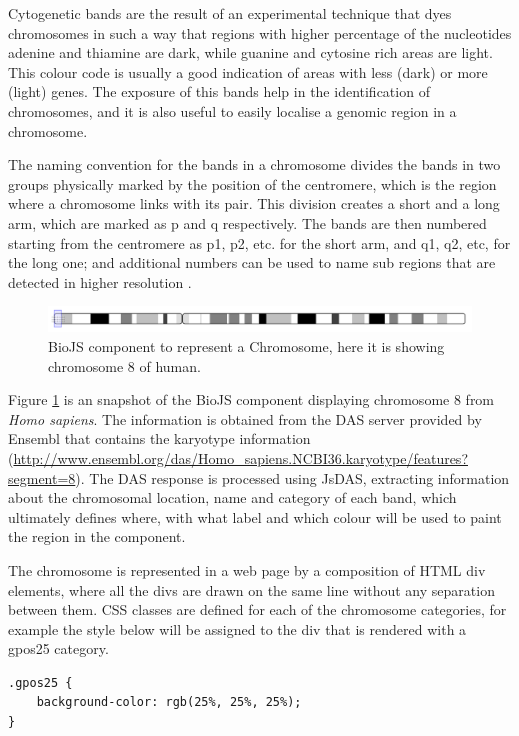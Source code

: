 Cytogenetic bands are the result of an experimental technique that dyes chromosomes in such a way that regions with higher percentage of the nucleotides adenine and thiamine are dark, while guanine and cytosine rich areas are light. This colour code is usually a good indication of areas with less (dark) or more (light) genes. The exposure of this bands help in the identification of chromosomes, and it is also useful to easily localise a genomic region in a chromosome.

The naming convention for the bands in a chromosome divides the bands in two groups physically marked by the position of the centromere, which is the region where a chromosome links with its pair. This division creates a short and a long arm, which are marked as p and q respectively. The bands are then numbered starting from the centromere as p1, p2, etc. for the short arm, and q1, q2, etc, for the long one; and additional numbers can be used to name sub regions that are detected in higher resolution \cite{NLM2013}.

\begin{figure}[ht]
\centering
\includegraphics[width=\textwidth]{figures/chromosome.png}
\caption[BioJS component to represent a Chromosome]{BioJS component to represent a Chromosome, here it is showing chromosome 8 of human.
\label{fig:biojs_chromosome}}
\end{figure}

Figure \ref{fig:biojs_chromosome} is an snapshot of the BioJS component displaying chromosome 8 from \emph{Homo sapiens}. The information is obtained from the DAS server provided by Ensembl that contains the karyotype information (\url{http://www.ensembl.org/das/Homo_sapiens.NCBI36.karyotype/features?segment=8}). The DAS response is processed using JsDAS, extracting information about the chromosomal location, name and category of each band, which ultimately defines where, with what label and which colour will be used to paint the region in the component.

The chromosome is represented in a web page by a composition of HTML div elements, where all the divs are drawn on the same line without any separation between them. CSS classes are defined for each of the chromosome categories, for example the style below will be assigned to the div that is rendered with a gpos25 category.

\begin{lstlisting}[language=HTML]
.gpos25 {
	background-color: rgb(25%, 25%, 25%);
}
\end{lstlisting}

